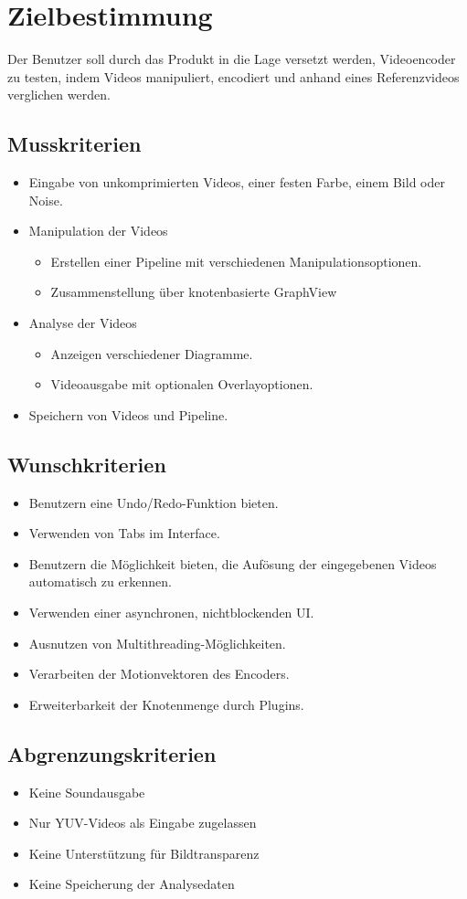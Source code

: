 \section{Zielbestimmung}

Der Benutzer soll durch das Produkt in die Lage versetzt werden, Videoencoder zu testen, indem Videos manipuliert, encodiert und anhand eines Referenzvideos verglichen werden.

\subsection{Musskriterien}

\begin{itemize}
	\item Eingabe von unkomprimierten Videos, einer festen Farbe, einem Bild oder Noise.
	\item Manipulation der Videos
	\begin{itemize}
		\item Erstellen einer Pipeline mit verschiedenen Manipulationsoptionen.
		\item Zusammenstellung über knotenbasierte GraphView
	\end{itemize}
	\item Analyse der Videos
	\begin{itemize}
		\item Anzeigen verschiedener Diagramme.
		\item Videoausgabe mit optionalen Overlayoptionen.
	\end{itemize}
	\item Speichern von Videos und Pipeline.
\end{itemize}

\subsection{Wunschkriterien}

\begin{itemize}
	\item Benutzern eine Undo/Redo-Funktion bieten.
	\item Verwenden von Tabs im Interface.
	\item Benutzern die Möglichkeit bieten, die Aufösung der eingegebenen Videos automatisch zu erkennen.
	\item Verwenden einer asynchronen, nichtblockenden UI.
	\item Ausnutzen von Multithreading-Möglichkeiten.
	\item Verarbeiten der Motionvektoren des Encoders.
	\item Erweiterbarkeit der Knotenmenge durch Plugins.
\end{itemize}

\subsection{Abgrenzungskriterien}

\begin{itemize}
	\item Keine Soundausgabe
	\item Nur YUV-Videos als Eingabe zugelassen
    \item Keine Unterstützung für Bildtransparenz
	\item Keine Speicherung der Analysedaten
\end{itemize}
